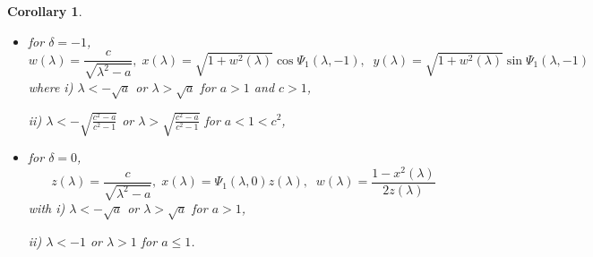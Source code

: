 \documentclass{amsart}
\newtheorem{Corollary}[Theorem]{Corollary}
\theoremstyle{definition}
\numberwithin{equation}{section}
\begin{document}
\begin{Corollary}
\begin{itemize}
    \item [2.] for $\delta=-1$,
        $$w(\lambda)=\frac{c}{\sqrt{\lambda^2-a}},\;
        x(\lambda)=\sqrt{1+w^2(\lambda)}
        \cos{\Psi_1(\lambda,-1)},
        \;\;
        y(\lambda)=\sqrt{1+w^2(\lambda)}
        \sin{\Psi_1(\lambda,-1)}$$
       where 
       \subitem i) $\lambda<-\sqrt{a}$ or $\lambda>\sqrt{a}$ for $a>1$ and $c>1$,
       
       \subitem ii) $\lambda<-\sqrt{\frac{c^2-a}{c^2-1}}$ or $\lambda>\sqrt{\frac{c^2-a}{c^2-1}}$ for $a<1<c^2$, 
       
     \item [3.] for $\delta=0$, 
      $$z(\lambda)=\frac{c}{\sqrt{\lambda^2-a}},\;
        x(\lambda)=\Psi_{1}(\lambda,0)z(\lambda),
        \;\;
        w(\lambda)=\frac{1-x^2(\lambda)}{2z(\lambda)}$$
       with 
       \subitem i) $\lambda<-\sqrt{a}$ or $\lambda>\sqrt{a}$ for $a>1$,
       
       \subitem ii) $\lambda<-1$ or $\lambda>1$ for $a\leq 1$.
\end{itemize}
\end{Corollary}
\end{document}
